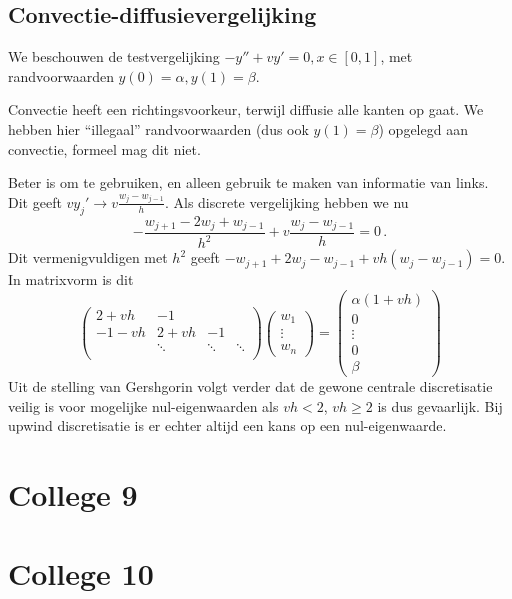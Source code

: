 \documentclass{2wn20summary}
\begin{document}
			\subsection{Convectie-diffusievergelijking}
				We beschouwen de testvergelijking $ -y'' + vy' = 0, x\in [0,1] $, met randvoorwaarden $ y(0) = \alpha, y(1)=\beta $. 
				\begin{opm}
					Convectie heeft een richtingsvoorkeur, terwijl diffusie alle kanten op gaat. We hebben hier ``illegaal'' randvoorwaarden (dus ook $ y(1) = \beta $) opgelegd aan convectie, formeel mag dit niet.
				\end{opm}
				Beter is om  te gebruiken, en alleen gebruik te maken van informatie van links. Dit geeft $ vy_j' \to v \frac{w_j-w_{j-1}}{h} $. Als discrete vergelijking hebben we nu
				\[ 
					- \frac{w_{j+1}-2w_j + w_{j-1}}{h^2} + v \frac{w_j-w_{j-1}}{h} = 0\,.
				\]
				Dit vermenigvuldigen met $ h^2 $ geeft $ -w_{j+1}+2w_j-w_{j-1}+vh(w_j-w_{j-1}) = 0 $. In matrixvorm is dit 
				\[ 
				\begin{pmatrix}
					2+vh & -1 & & \\
					-1-vh & 2+vh & -1 & \\
					& \ddots & \ddots & \ddots \\
				\end{pmatrix}
				\begin{pmatrix}
					w_1 \\ \vdots \\ w_n
				\end{pmatrix}
				= \begin{pmatrix}
					\alpha(1+vh) \\ 0\\ \vdots \\ 0 \\ \beta
				\end{pmatrix}
				\]
				Uit de stelling van Gershgorin volgt verder dat de gewone centrale discretisatie veilig is voor mogelijke nul-eigenwaarden als $vh<2$, $vh\ge 2$ is dus gevaarlijk. Bij upwind discretisatie is er echter altijd een kans op een nul-eigenwaarde.
				
	\section{College 9}
	
	\newpage
	\section{College 10}
\end{document}
